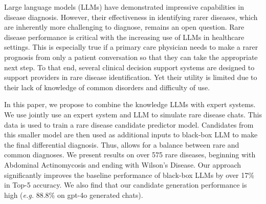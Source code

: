 

Large language models (LLMs) have demonstrated impressive capabilities in disease diagnosis. However, their effectiveness in identifying rarer diseases, which are inherently more challenging to diagnose, remains an open question. Rare disease performance is critical with the increasing use of LLMs in healthcare settings.  This is especially true if a primary care physician needs to make a rarer prognosis from only a patient conversation so that they can take the appropriate next step. To that end, several clinical decision support systems are designed to support providers in rare disease identification. 
Yet their utility is limited due to their lack of knowledge of common disorders and difficulty of use.  

In this paper, we propose \methodname to combine the knowledge LLMs with expert systems.  We use jointly use an expert system and LLM to simulate rare disease chats.  This data is used to train a rare disease candidate predictor model.  Candidates from this smaller model are then used as additional inputs to black-box LLM to make the final differential diagnosis. Thus, \methodname allows for a balance between rare and common diagnoses.  We present results on over 575 rare diseases, beginning with Abdominal Actinomycosis and ending with Wilson's Disease.  Our approach significantly improves the baseline performance of black-box LLMs by over 17\% in Top-5 accuracy. We also find that our candidate generation performance is high (\textit{e.g.} 88.8\% on gpt-4o generated chats).